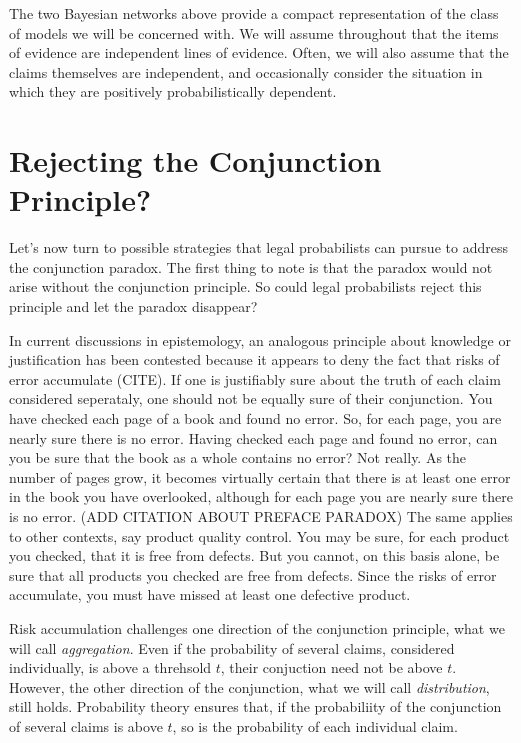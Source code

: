\documentclass[10pt,dvipsnames,enabledeprecatedfontcommands]{scrartcl}
\begin{document}
The two Bayesian networks above provide a compact representation of the
class of models we will be concerned with. We will assume throughout
that the items of evidence are independent lines of evidence. Often, we
will also assume that the claims themselves are independent, and
occasionally consider the situation in which they are positively
probabilistically dependent.

\hypertarget{rejecting-the-conjunction-principle}{%
\section{Rejecting the Conjunction
Principle?}\label{rejecting-the-conjunction-principle}}

Let's now turn to possible strategies that legal probabilists can pursue
to address the conjunction paradox. The first thing to note is that the
paradox would not arise without the conjunction principle. So could
legal probabilists reject this principle and let the paradox disappear?

In current discussions in epistemology, an analogous principle about
knowledge or justification has been contested because it appears to deny
the fact that risks of error accumulate (CITE).
If one is justifiably sure about the truth of each claim considered
seperataly, one should not be equally sure of their conjunction. You
have checked each page of a book and found no error. So, for each page,
you are nearly sure there is no error. Having checked each page and
found no error, can you be sure that the book as a whole contains no
error? Not really. As the number of pages grow, it becomes virtually
certain that there is at least one error in the book you have
overlooked, although for each page you are nearly sure there is no
error. (ADD CITATION ABOUT PREFACE PARADOX) The same applies to other
contexts, say product quality control. You may be sure, for each product
you checked, that it is free from defects. But you cannot, on this basis
alone, be sure that all products you checked are free from defects.
Since the risks of error accumulate, you must have missed at least one
defective product.

Risk accumulation challenges one direction of the conjunction principle,
what we will call \textit{aggregation}. Even if the probability of
several claims, considered individually, is above a threhsold \(t\),
their conjuction need not be above \(t\). However, the other direction
of the conjunction, what we will call \textit{distribution}, still
holds. Probability theory ensures that, if the probabiliity of the
conjunction of several claims is above \(t\), so is the probability of
each individual claim.
\end{document}
